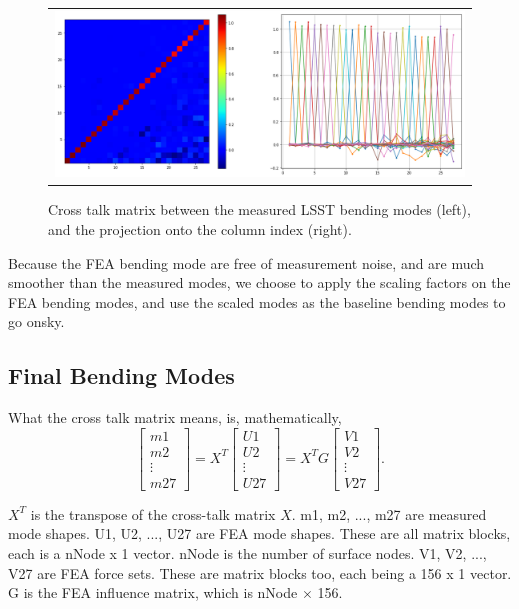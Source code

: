 \documentclass [twoside,openbib,12pt]{article}
\newcommand{\beq}{\begin{equation}}
\newcommand{\eeq}{\end{equation}}
\begin{document}
 \begin{figure}[bthp]
   \begin{center}
     \begin{tabular}{c}
\includegraphics[width=150mm]{figures/crossTalk.png}
  \end{tabular}
   \end{center}
   \caption
  { \label{fig:crossTalk}
Cross talk matrix between the measured LSST bending modes (left), and the
projection onto the column index (right).
 }
\end{figure}

Because the FEA bending mode are free of measurement noise, and are
much smoother than the measured modes, we 
choose to apply the scaling factors on the FEA bending modes, and use
the scaled modes as the baseline bending modes to go onsky.

\subsection{Final Bending Modes}

What the cross talk matrix means, is, mathematically,
\beq
\left[ \begin{array}{c} m1  \\ m2 \\ \vdots \\ m27 \end{array} \right]
= X^T
\left[ \begin{array}{c} U1  \\ U2 \\ \vdots \\ U27 \end{array} \right]
= X^T G
\left[ \begin{array}{c} V1  \\ V2 \\ \vdots \\ V27 \end{array} \right].
\eeq

$X^T$ is the transpose of the cross-talk matrix $X$.
m1, m2, ..., m27 are measured mode shapes. U1, U2, ..., U27 are FEA mode shapes. These are all matrix blocks, each is a nNode x 1 vector. nNode is the number of surface nodes. 
V1, V2, ..., V27 are FEA force sets. These are matrix blocks too, each being a 156 x 1 vector. G is the FEA influence matrix, which is nNode $\times$ 156.
\end{document}
